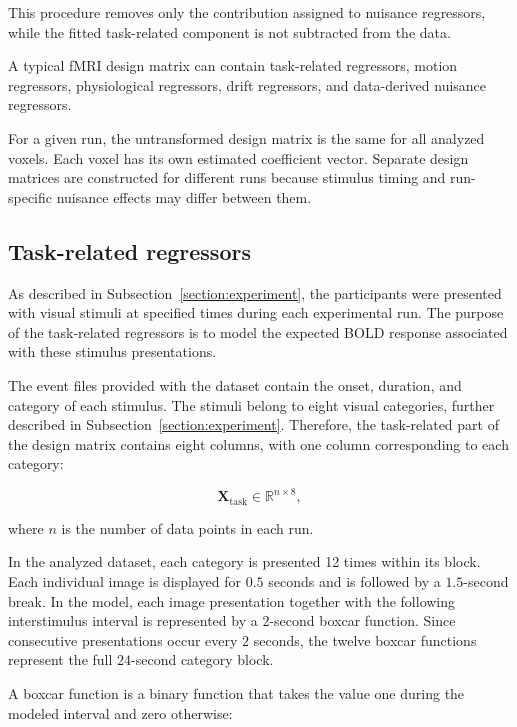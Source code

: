 \documentclass[english]{pwr_wmat_praca_dyplomowa}
\theoremstyle{definition}
\theoremstyle{remark}
\begin{document}
This procedure removes only the contribution assigned to nuisance regressors, while the fitted task-related component is not subtracted from the data.

A typical fMRI design matrix can contain task-related regressors, motion regressors, physiological regressors, drift regressors, and data-derived nuisance regressors.

For a given run, the untransformed design matrix is the same for all analyzed voxels. Each voxel has its own estimated coefficient vector. Separate design matrices are constructed for different runs because stimulus timing and run-specific nuisance effects may differ between them.

\subsection{Task-related regressors}
\label{section:task-regressors}

As described in Subsection~\ref{section:experiment}, the participants were presented with visual stimuli at specified times during each experimental run. The purpose of the task-related regressors is to model the expected BOLD response associated with these stimulus presentations.

The event files provided with the dataset contain the onset, duration, and category of each stimulus. The stimuli belong to eight visual categories, further described in Subsection~\ref{section:experiment}. Therefore, the task-related part of the design matrix contains eight columns, with one column corresponding to each category:

\begin{equation}
    \mathbf{X}_{\mathrm{task}} \in \mathbb{R}^{n \times 8},
\end{equation}

where $n$ is the number of data points in each run.

In the analyzed dataset, each category is presented 12 times within its block. Each individual image is displayed for $0.5$ seconds and is followed by a $1.5$-second break. In the model, each image presentation together with the following interstimulus interval is represented by a $2$-second boxcar function. Since consecutive presentations occur every $2$ seconds, the twelve boxcar functions represent the full $24$-second category block.

A boxcar function is a binary function that takes the value one during the modeled interval and zero otherwise:
\end{document}
